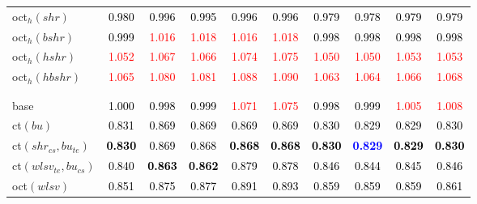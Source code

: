 \begin{tabular}[t]{l|ccccccccc}
oct$_h(shr)$ & \textcolor{black}{0.980} & \textcolor{black}{0.996} & \textcolor{black}{0.995} & \textcolor{black}{0.996} & \textcolor{black}{0.996} & \textcolor{black}{0.979} & \textcolor{black}{0.978} & \textcolor{black}{0.979} & \textcolor{black}{0.979}\\
oct$_h(bshr)$ & \textcolor{black}{0.999} & \textcolor{red}{1.016} & \textcolor{red}{1.018} & \textcolor{red}{1.016} & \textcolor{red}{1.018} & \textcolor{black}{0.998} & \textcolor{black}{0.998} & \textcolor{black}{0.998} & \textcolor{black}{0.998}\\
oct$_h(hshr)$ & \textcolor{red}{1.052} & \textcolor{red}{1.067} & \textcolor{red}{1.066} & \textcolor{red}{1.074} & \textcolor{red}{1.075} & \textcolor{red}{1.050} & \textcolor{red}{1.050} & \textcolor{red}{1.053} & \textcolor{red}{1.053}\\
oct$_h(hbshr)$ & \textcolor{red}{1.065} & \textcolor{red}{1.080} & \textcolor{red}{1.081} & \textcolor{red}{1.088} & \textcolor{red}{1.090} & \textcolor{red}{1.063} & \textcolor{red}{1.064} & \textcolor{red}{1.066} & \textcolor{red}{1.068}\\[-1.5ex]
\hline\\[-1.5ex]
\addlinespace[0.3em]
\multicolumn{10}{c}{\textbf{$k = 2$}}\\
base & \textcolor{black}{1.000} & \textcolor{black}{0.998} & \textcolor{black}{0.999} & \textcolor{red}{1.071} & \textcolor{red}{1.075} & \textcolor{black}{0.998} & \textcolor{black}{0.999} & \textcolor{red}{1.005} & \textcolor{red}{1.008}\\
ct$(bu)$ & \textcolor{black}{0.831} & \textcolor{black}{0.869} & \textcolor{black}{0.869} & \textcolor{black}{0.869} & \textcolor{black}{0.869} & \textcolor{black}{0.830} & \textcolor{black}{0.829} & \textcolor{black}{0.829} & \textcolor{black}{0.830}\\
ct$(shr_{cs}, bu_{te})$ & \textcolor{black}{\textbf{0.830}} & \textcolor{black}{0.869} & \textcolor{black}{0.868} & \textcolor{black}{\textbf{0.868}} & \textcolor{black}{\textbf{0.868}} & \textcolor{black}{\textbf{0.830}} & \textcolor{blue}{\textbf{0.829}} & \textcolor{black}{\textbf{0.829}} & \textcolor{black}{\textbf{0.830}}\\
ct$(wlsv_{te}, bu_{cs})$ & \textcolor{black}{0.840} & \textcolor{black}{\textbf{0.863}} & \textcolor{black}{\textbf{0.862}} & \textcolor{black}{0.879} & \textcolor{black}{0.878} & \textcolor{black}{0.846} & \textcolor{black}{0.844} & \textcolor{black}{0.845} & \textcolor{black}{0.846}\\
oct$(wlsv)$ & \textcolor{black}{0.851} & \textcolor{black}{0.875} & \textcolor{black}{0.877} & \textcolor{black}{0.891} & \textcolor{black}{0.893} & \textcolor{black}{0.859} & \textcolor{black}{0.859} & \textcolor{black}{0.859} & \textcolor{black}{0.861}\\

\end{tabular}
